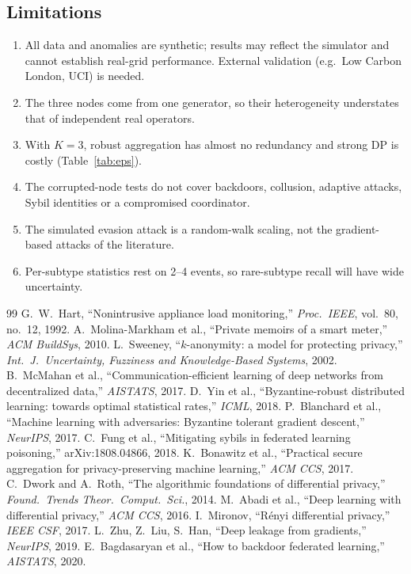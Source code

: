\documentclass[11pt,a4paper]{article}
\begin{document}
\subsection{Limitations}

\begin{enumerate}
  \item All data and anomalies are synthetic; results may reflect the simulator and cannot establish real-grid performance. External validation (e.g.\ Low Carbon London, UCI) is needed.
  \item The three nodes come from one generator, so their heterogeneity understates that of independent real operators.
  \item With $K=3$, robust aggregation has almost no redundancy and strong DP is costly (Table~\ref{tab:eps}).
  \item The corrupted-node tests do not cover backdoors, collusion, adaptive attacks, Sybil identities or a compromised coordinator.
  \item The simulated evasion attack is a random-walk scaling, not the gradient-based attacks of the literature.
  \item Per-subtype statistics rest on 2--4 events, so rare-subtype recall will have wide uncertainty.
\end{enumerate}

\begin{thebibliography}{99}\small
{} G.~W.~Hart, ``Nonintrusive appliance load monitoring,'' \emph{Proc.\ IEEE}, vol.~80, no.~12, 1992.
 A.~Molina-Markham et al., ``Private memoirs of a smart meter,'' \emph{ACM BuildSys}, 2010.
 L.~Sweeney, ``$k$-anonymity: a model for protecting privacy,'' \emph{Int.\ J.\ Uncertainty, Fuzziness and Knowledge-Based Systems}, 2002.
 B.~McMahan et al., ``Communication-efficient learning of deep networks from decentralized data,'' \emph{AISTATS}, 2017.
 D.~Yin et al., ``Byzantine-robust distributed learning: towards optimal statistical rates,'' \emph{ICML}, 2018.
 P.~Blanchard et al., ``Machine learning with adversaries: Byzantine tolerant gradient descent,'' \emph{NeurIPS}, 2017.
 C.~Fung et al., ``Mitigating sybils in federated learning poisoning,'' arXiv:1808.04866, 2018.
 K.~Bonawitz et al., ``Practical secure aggregation for privacy-preserving machine learning,'' \emph{ACM CCS}, 2017.
 C.~Dwork and A.~Roth, ``The algorithmic foundations of differential privacy,'' \emph{Found.\ Trends Theor.\ Comput.\ Sci.}, 2014.
 M.~Abadi et al., ``Deep learning with differential privacy,'' \emph{ACM CCS}, 2016.
 I.~Mironov, ``R\'enyi differential privacy,'' \emph{IEEE CSF}, 2017.
 L.~Zhu, Z.~Liu, S.~Han, ``Deep leakage from gradients,'' \emph{NeurIPS}, 2019.
 E.~Bagdasaryan et al., ``How to backdoor federated learning,'' \emph{AISTATS}, 2020.
\end{thebibliography}
\end{document}
